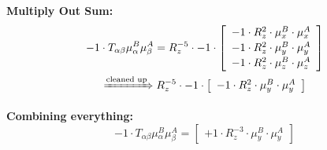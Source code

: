 \documentclass{article}
\begin{document}
\textbf{Multiply Out Sum:}
\begin{subequations}\begin{gather}
- 1 \cdot T_{\alpha{}\beta{}} \mu{}^{B}_{\alpha{}} \mu{}^{A}_{\beta{}} = R_{z}^{-5} \cdot -1 \cdot  \left[ \begin{array}{c} 
 		- 1 \cdot R_{z}^{2} \cdot \mu{}^{B}_{x} \cdot \mu{}^{A}_{x} 
 \\[0.2em] 		 - 1 \cdot R_{z}^{2} \cdot \mu{}^{B}_{y} \cdot \mu{}^{A}_{y} 
 \\[0.2em] 		 - 1 \cdot R_{z}^{2} \cdot \mu{}^{B}_{z} \cdot \mu{}^{A}_{z}
 \end{array}\right] 
\\ \xRightarrow{\text{cleaned up}}
 R_{z}^{-5} \cdot -1 \cdot  \left[ \begin{array}{c} 
 		- 1 \cdot R_{z}^{2} \cdot \mu{}^{B}_{y} \cdot \mu{}^{A}_{y}
 \end{array}\right] 
\end{gather}\end{subequations}


\textbf{Combining everything:}
\begin{equation}
- 1 \cdot T_{\alpha{}\beta{}} \mu{}^{B}_{\alpha{}} \mu{}^{A}_{\beta{}} =  \left[ \begin{array}{c} 
 		+ 1 \cdot R_{z}^{-3} \cdot \mu{}^{B}_{y} \cdot \mu{}^{A}_{y}
 \end{array}\right] 
\end{equation}
\end{document}
